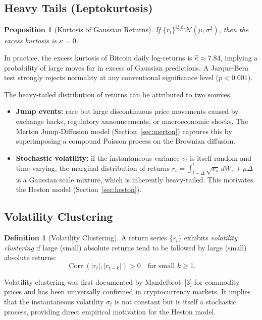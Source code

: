 \documentclass[12pt, a4paper, oneside]{report}
\theoremstyle{plain}
\newtheorem{proposition}[theorem]{Proposition}
\theoremstyle{definition}
\newtheorem{definition}[theorem]{Definition}
\theoremstyle{remark}
\begin{document}
\subsection{Heavy Tails (Leptokurtosis)}

\begin{proposition}[Kurtosis of Gaussian Returns]
If $\{r_t\} \overset{\text{i.i.d.}}{\sim} \mathcal{N}(\mu, \sigma^2)$, then the
excess kurtosis is $\kappa = 0$.
\end{proposition}

In practice, the excess kurtosis of Bitcoin daily log-returns is
$\hat{\kappa} \approx 7.84$, implying a probability of large moves far in
excess of Gaussian predictions.  A Jarque-Bera test strongly rejects normality
at any conventional significance level ($p < 0.001$).

The heavy-tailed distribution of returns can be attributed to two sources.

\begin{itemize}[leftmargin=1.25cm]
  \item \textbf{Jump events:} rare but large discontinuous price movements caused
    by exchange hacks, regulatory announcements, or macroeconomic shocks.  The Merton
    Jump-Diffusion model (Section~\ref{sec:merton}) captures this by superimposing a
    compound Poisson process on the Brownian diffusion.
  \item \textbf{Stochastic volatility:} if the instantaneous variance $v_t$ is itself
    random and time-varying, the marginal distribution of returns
    $r_t = \int_{t-\Delta}^t \sqrt{v_s}\,dW_s + \mu\Delta$ is a Gaussian scale mixture,
    which is inherently heavy-tailed.  This motivates the Heston model (Section~\ref{sec:heston}).
\end{itemize}

\subsection{Volatility Clustering}

\begin{definition}[Volatility Clustering]
A return series $\{r_t\}$ exhibits \emph{volatility clustering} if large (small)
absolute returns tend to be followed by large (small) absolute returns:
\[
  \operatorname{Corr}(|r_t|, |r_{t-k}|) > 0 \quad \text{for small } k \geq 1.
\]
\end{definition}

Volatility clustering was first documented by Mandelbrot~[3] for commodity prices and
has been universally confirmed in cryptocurrency markets.  It implies that the
instantaneous volatility $\sigma_t$ is not constant but is itself a stochastic process,
providing direct empirical motivation for the Heston model.
\end{document}
